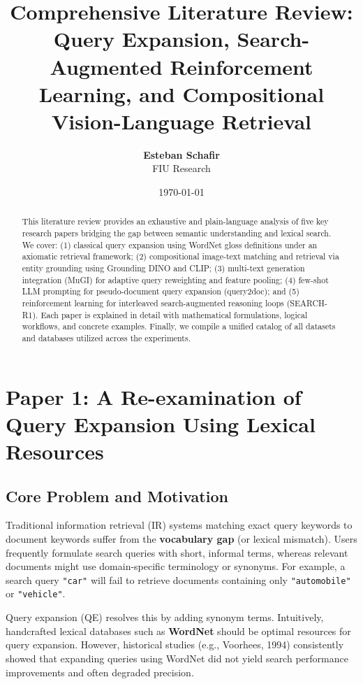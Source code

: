 \documentclass[11pt,a4paper]{article}
\title{\textbf{Comprehensive Literature Review:\\Query Expansion, Search-Augmented Reinforcement Learning, and Compositional Vision-Language Retrieval}}
\author{\textbf{Esteban Schafir} \\ FIU Research}
\date{\today}
\begin{document}
\maketitle

\begin{abstract}
This literature review provides an exhaustive and plain-language analysis of five key research papers bridging the gap between semantic understanding and lexical search. We cover: (1) classical query expansion using WordNet gloss definitions under an axiomatic retrieval framework; (2) compositional image-text matching and retrieval via entity grounding using Grounding DINO and CLIP; (3) multi-text generation integration (MuGI) for adaptive query reweighting and feature pooling; (4) few-shot LLM prompting for pseudo-document query expansion (query2doc); and (5) reinforcement learning for interleaved search-augmented reasoning loops (SEARCH-R1). Each paper is explained in detail with mathematical formulations, logical workflows, and concrete examples. Finally, we compile a unified catalog of all datasets and databases utilized across the experiments.
\end{abstract}

\newpage
\tableofcontents
\newpage

\section{Paper 1: A Re-examination of Query Expansion Using Lexical Resources}
\label{sec:paper1}

\subsection{Core Problem and Motivation}
Traditional information retrieval (IR) systems matching exact query keywords to document keywords suffer from the \textbf{vocabulary gap} (or lexical mismatch). Users frequently formulate search queries with short, informal terms, whereas relevant documents might use domain-specific terminology or synonyms. For example, a search query \texttt{"car"} will fail to retrieve documents containing only \texttt{"automobile"} or \texttt{"vehicle"}.

Query expansion (QE) resolves this by adding synonym terms. Intuitively, handcrafted lexical databases such as \textbf{WordNet} should be optimal resources for query expansion. However, historical studies (e.g., Voorhees, 1994) consistently showed that expanding queries using WordNet did not yield search performance improvements and often degraded precision.
\end{document}
